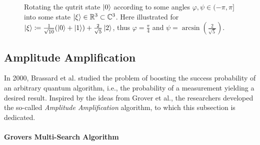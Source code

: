 \begin{figure}[!hbtp]
    \centering
    \caption{Rotating the qutrit state \(\ket{0}\) according to some angles \(\varphi, \psi \in (-\pi, \pi]\) into some state \(\ket{\xi} \in \mathbb{R}^3 \subset \mathbb{C}^3\). Here illustrated for \(\ket{\xi} \coloneqq \frac{1}{\sqrt{10}}(\ket{0}+\ket{1})+\frac{2}{\sqrt{5}}\ket{2}\), thus \(\varphi = \frac{\pi}{4}\) and \(\psi = \arcsin\left(\frac{2}{\sqrt{5}}\right)\).}
    \label{qutrit_rotation_figure}
\end{figure}

\subsection{Amplitude Amplification } \label{amplitude_amplification_section}

In 2000, Brassard et al. \cite[pp. 4-10]{Brassard2000} studied the problem of boosting the success probability of an arbitrary quantum algorithm, i.e., the probability of a measurement yielding a desired result. Inspired by the ideas from Grover et al., the researchers developed the so-called \emph{Amplitude Amplification} algorithm, to which this subsection is dedicated.

\paragraph*{Grovers Multi-Search Algorithm} \phantom{}\\\phantom{}

